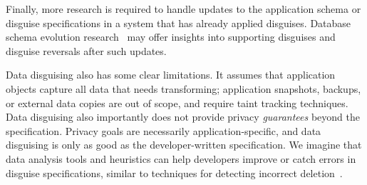 %
Finally, more research is required to handle updates to the application schema or
disguise specifications in a system that has already applied disguises.
%
Database schema evolution research~\cite{schema:evo} may offer insights
into supporting disguises and disguise reversals after such updates.
%

%
Data disguising also has some clear limitations.
%
It assumes that application objects capture all data that needs
transforming; application snapshots, backups, or external data copies are out of scope,
and require \eg taint tracking techniques.
%
Data disguising also importantly does not provide privacy \emph{guarantees} beyond the
specification.
%
Privacy goals are necessarily application-specific, and data disguising is only as good
as the developer-written specification.
%
We imagine that data analysis tools and heuristics can help developers improve or catch
errors in disguise specifications, similar to \eg techniques for detecting incorrect
deletion~\cite{delf}.
%
%




\iffalse
